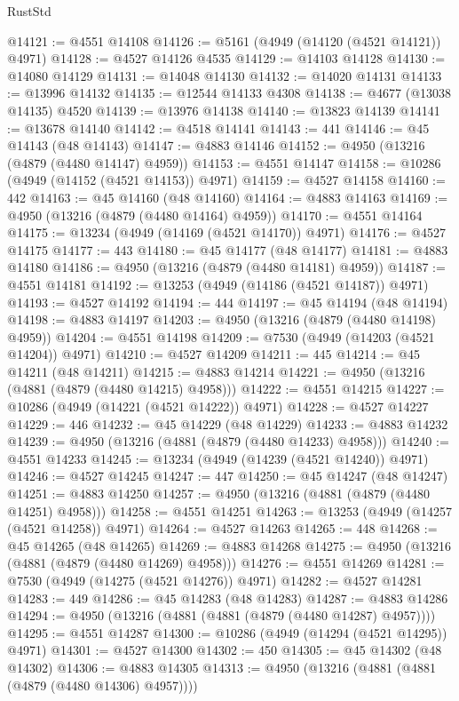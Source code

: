 \begin{lexlean}{RustStd}
\begin{coremodule}
@14121 := @4551 @14108
@14126 := @5161 (@4949 (@14120 (@4521 @14121)) @4971)
@14128 := @4527 @14126 @4535
@14129 := @14103 @14128
@14130 := @14080 @14129
@14131 := @14048 @14130
@14132 := @14020 @14131
@14133 := @13996 @14132
@14135 := @12544 @14133 @4308
@14138 := @4677 (@13038 @14135) @4520
@14139 := @13976 @14138
@14140 := @13823 @14139
@14141 := @13678 @14140
@14142 := @4518 @14141
@14143 := 441
@14146 := @45 @14143 (@48 @14143)
@14147 := @4883 @14146
@14152 := @4950 (@13216 (@4879 (@4480 @14147) @4959))
@14153 := @4551 @14147
@14158 := @10286 (@4949 (@14152 (@4521 @14153)) @4971)
@14159 := @4527 @14158
@14160 := 442
@14163 := @45 @14160 (@48 @14160)
@14164 := @4883 @14163
@14169 := @4950 (@13216 (@4879 (@4480 @14164) @4959))
@14170 := @4551 @14164
@14175 := @13234 (@4949 (@14169 (@4521 @14170)) @4971)
@14176 := @4527 @14175
@14177 := 443
@14180 := @45 @14177 (@48 @14177)
@14181 := @4883 @14180
@14186 := @4950 (@13216 (@4879 (@4480 @14181) @4959))
@14187 := @4551 @14181
@14192 := @13253 (@4949 (@14186 (@4521 @14187)) @4971)
@14193 := @4527 @14192
@14194 := 444
@14197 := @45 @14194 (@48 @14194)
@14198 := @4883 @14197
@14203 := @4950 (@13216 (@4879 (@4480 @14198) @4959))
@14204 := @4551 @14198
@14209 := @7530 (@4949 (@14203 (@4521 @14204)) @4971)
@14210 := @4527 @14209
@14211 := 445
@14214 := @45 @14211 (@48 @14211)
@14215 := @4883 @14214
@14221 := @4950 (@13216 (@4881 (@4879 (@4480 @14215) @4958)))
@14222 := @4551 @14215
@14227 := @10286 (@4949 (@14221 (@4521 @14222)) @4971)
@14228 := @4527 @14227
@14229 := 446
@14232 := @45 @14229 (@48 @14229)
@14233 := @4883 @14232
@14239 := @4950 (@13216 (@4881 (@4879 (@4480 @14233) @4958)))
@14240 := @4551 @14233
@14245 := @13234 (@4949 (@14239 (@4521 @14240)) @4971)
@14246 := @4527 @14245
@14247 := 447
@14250 := @45 @14247 (@48 @14247)
@14251 := @4883 @14250
@14257 := @4950 (@13216 (@4881 (@4879 (@4480 @14251) @4958)))
@14258 := @4551 @14251
@14263 := @13253 (@4949 (@14257 (@4521 @14258)) @4971)
@14264 := @4527 @14263
@14265 := 448
@14268 := @45 @14265 (@48 @14265)
@14269 := @4883 @14268
@14275 := @4950 (@13216 (@4881 (@4879 (@4480 @14269) @4958)))
@14276 := @4551 @14269
@14281 := @7530 (@4949 (@14275 (@4521 @14276)) @4971)
@14282 := @4527 @14281
@14283 := 449
@14286 := @45 @14283 (@48 @14283)
@14287 := @4883 @14286
@14294 := @4950 (@13216 (@4881 (@4881 (@4879 (@4480 @14287) @4957))))
@14295 := @4551 @14287
@14300 := @10286 (@4949 (@14294 (@4521 @14295)) @4971)
@14301 := @4527 @14300
@14302 := 450
@14305 := @45 @14302 (@48 @14302)
@14306 := @4883 @14305
@14313 := @4950 (@13216 (@4881 (@4881 (@4879 (@4480 @14306) @4957))))

\end{coremodule}
\end{lexlean}
